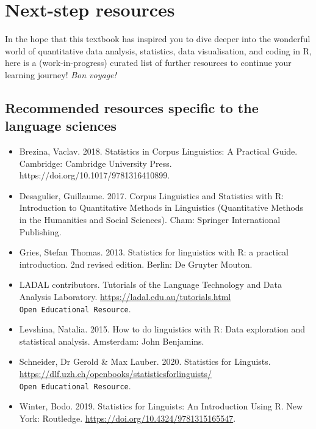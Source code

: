\documentclass[
  letterpaper,
  DIV=11,
  numbers=noendperiod]{scrreprt}
\begin{document}
\cleardoublepage
{}
{}
\appendix

\chapter{Next-step resources}\label{next-step-resources}

In the hope that this textbook has inspired you to dive deeper into the
wonderful world of quantitative data analysis, statistics, data
visualisation, and coding in R, here is a (work-in-progress) curated
list of further resources to continue your learning journey! \emph{Bon
voyage!} 🚀✨

\section{Recommended resources specific to the language
sciences}\label{recommended-resources-specific-to-the-language-sciences}

\begin{itemize}
\item
  Brezina, Vaclav. 2018. Statistics in Corpus Linguistics: A Practical
  Guide. Cambridge: Cambridge University Press.
  https://doi.org/10.1017/9781316410899.
\item
  Desagulier, Guillaume. 2017. Corpus Linguistics and Statistics with R:
  Introduction to Quantitative Methods in Linguistics (Quantitative
  Methods in the Humanities and Social Sciences). Cham: Springer
  International Publishing.
\item
  Gries, Stefan Thomas. 2013. Statistics for linguistics with R: a
  practical introduction. 2nd revised edition. Berlin: De Gruyter
  Mouton.
\item
  LADAL contributors. Tutorials of the Language Technology and Data
  Analysis Laboratory. \url{https://ladal.edu.au/tutorials.html}
  \texttt{Open\ Educational\ Resource}.
\item
  Levshina, Natalia. 2015. How to do linguistics with R: Data
  exploration and statistical analysis. Amsterdam: John Benjamins.
\item
  Schneider, Dr Gerold \& Max Lauber. 2020. Statistics for Linguists.
  \url{https://dlf.uzh.ch/openbooks/statisticsforlinguists/}
  \texttt{Open\ Educational\ Resource}.
\item
  Winter, Bodo. 2019. Statistics for Linguists: An Introduction Using R.
  New York: Routledge.
  \href{https://doi.org/10.1017/9781316410899}{https://doi.org/10.4324/9781315165547}.
\end{itemize}
\end{document}
